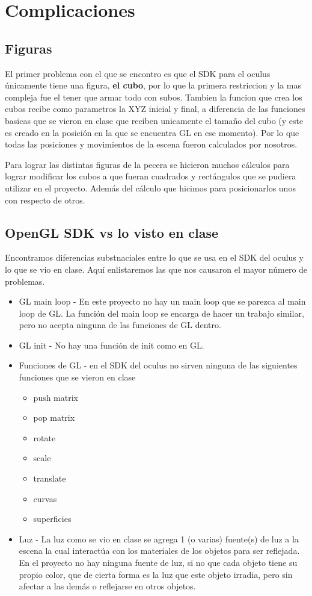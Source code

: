 \documentclass[10pt, a4paper, twocolumn]{article}
\begin{document}
\section{Complicaciones}
\subsection{Figuras}
El primer problema con el que se encontro es que el SDK para el oculus únicamente tiene una figura, \textbf{el cubo}, por lo que la primera restriccion y la mas compleja fue el tener que armar todo con subos. Tambien la funcion que crea los cubos recibe como parametros la XYZ inicial y final, a diferencia de las funciones basicas que se vieron en clase que reciben unicamente el tamaño del cubo (y este es creado en la posición en la que se encuentra GL en ese momento). Por lo que todas las posiciones y movimientos de la escena fueron calculados por nosotros. 

Para lograr las distintas figuras de la pecera se hicieron muchos cálculos para lograr modificar los cubos a que fueran cuadrados y rectángulos que se pudiera utilizar en el proyecto. Además del cálculo que hicimos para posicionarlos unos con respecto de otros.

\subsection{OpenGL SDK vs lo visto en clase}
Encontramos diferencias substnaciales entre lo que se usa en el SDK del oculus y lo que se vio en clase. Aquí enlistaremos las que nos causaron el mayor número de problemas. \begin{itemize}
\item GL main loop - En este proyecto no hay un main loop que se parezca al main loop de GL. La función del main loop se encarga de hacer un trabajo similar, pero no acepta ninguna de las funciones de GL dentro.
\item GL init - No hay una función de init como en GL.
\item Funciones de GL - en el SDK del oculus no sirven ninguna de las siguientes funciones que se vieron en clase
\begin{itemize}
\item push matrix
\item pop matrix
\item rotate
\item scale 
\item translate
\item curvas 
\item superficies
\end{itemize}
\item Luz - La luz como se vio en clase se agrega 1 (o varias) fuente(s) de luz a la escena la cual interactúa con los materiales de los objetos para ser reflejada. En el proyecto no hay ninguna fuente de luz, si no que cada objeto tiene su propio color, que de cierta forma es la luz que este objeto irradia, pero sin afectar a las demás o reflejarse en otros objetos.
\end{itemize}
\end{document}
